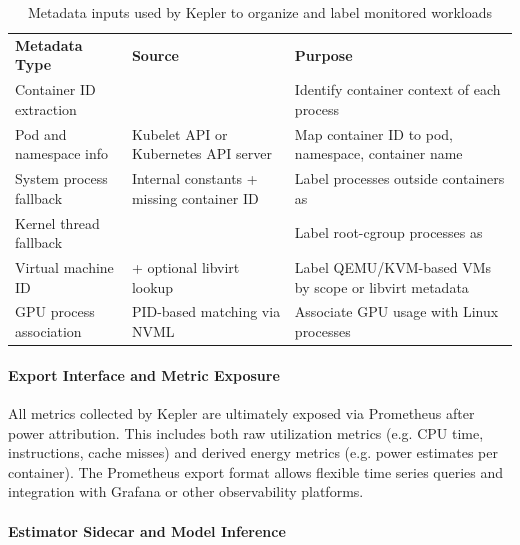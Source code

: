 \begin{table}[h]
    \small
    \centering
    \begin{tabular}{ |L{4.5cm} | L{5cm} | L{4.5cm}| } 
        \hline
        \textbf{Metadata Type} & \textbf{Source} & \textbf{Purpose} \\
        \Xhline{1.5pt}
        Container ID extraction &  & Identify container context of each process \\
        \hline
        Pod and namespace info & Kubelet API or Kubernetes API server & Map container ID to pod, namespace, container name \\
        \hline
        System process fallback & Internal constants + missing container ID & Label processes outside containers as  \\
        \hline
        Kernel thread fallback &  & Label root-cgroup processes as  \\
        \hline
        Virtual machine ID &  + optional libvirt lookup & Label QEMU/KVM-based VMs by scope or libvirt metadata \\
        \hline
        GPU process association & PID-based matching via NVML & Associate GPU usage with Linux processes \\
        \hline
    \end{tabular}
    \caption[Metadata inputs used by Kepler]{Metadata inputs used by Kepler to organize and label monitored workloads}
    \label{tab:kepler-metadata-inputs}
\end{table}

\paragraph{Export Interface and Metric Exposure}

All metrics collected by Kepler are ultimately exposed via Prometheus after power attribution. This includes both raw utilization metrics (e.g. CPU time, instructions, cache misses) and derived energy metrics (e.g. power estimates per container). The Prometheus export format allows flexible time series queries and integration with Grafana or other observability platforms.

\paragraph{Estimator Sidecar and Model Inference}

